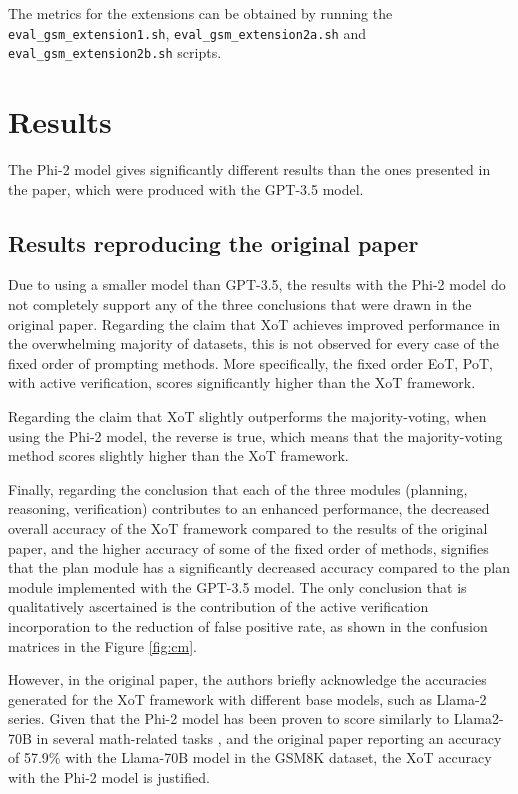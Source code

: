 \documentclass[10pt]{article} %
\begin{document}
The metrics for the extensions can be obtained by running the \texttt{eval\_gsm\_extension1.sh}, \texttt{eval\_gsm\_extension2a.sh} and \texttt{eval\_gsm\_extension2b.sh} scripts.

\section{Results}
The Phi-2 model gives significantly different results than the ones presented in the paper, which were produced with the GPT-3.5 model.

\subsection{Results reproducing the original paper}

Due to using a smaller model than GPT-3.5, the results with the Phi-2 model do not completely support any of the three conclusions that were drawn in the original paper. Regarding the claim that XoT achieves improved performance in the overwhelming majority of datasets, this is not observed for every case of the fixed order of prompting methods. More specifically, the fixed order EoT, PoT, with active verification, scores significantly higher than the XoT framework. 

Regarding the claim that XoT slightly outperforms the majority-voting, when using the Phi-2 model, the reverse is true, which means that the majority-voting method scores slightly higher than the XoT framework. 

Finally, regarding the conclusion that each of the three modules (planning, reasoning, verification) contributes to an enhanced performance, the decreased overall accuracy of the XoT framework compared to the results of the original paper, and the higher accuracy of some of the fixed order of methods, signifies that the plan module has a significantly decreased accuracy compared to the plan module implemented with the GPT-3.5 model. The only conclusion that is qualitatively ascertained is the contribution of the active verification incorporation to the reduction of false positive rate, as shown in the confusion matrices in the Figure \ref{fig:cm}.

However, in the original paper, the authors briefly acknowledge the accuracies generated for the XoT framework with different base models, such as Llama-2 series. Given that the Phi-2 model has been proven to score similarly to Llama2-70B in several math-related tasks \citep{microsoft2023phi2}, and the original paper reporting an accuracy of 57.9\% with the Llama-70B model in the GSM8K dataset, the XoT accuracy with the Phi-2 model is justified.
\end{document}
